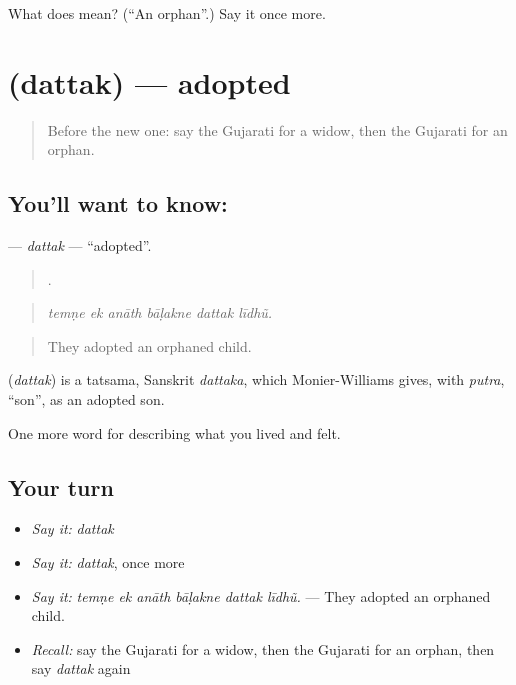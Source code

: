 \begin{tcolorbox}[breakable,colback=teal!4,colframe=teal!35!black,title={Before you move on}]
What does  mean? (\textquotedblleft{}An orphan\textquotedblright{}.) Say it once more.
\end{tcolorbox}
\section[\texorpdfstring{\gu{દત્તક} (dattak)}{દત્તક (dattak)}]{ (dattak) — adopted}

\label{lesson:GU-C500-dattak}



\begin{quote}
Before the new one: say the Gujarati for a widow, then the Gujarati for an orphan.
\end{quote}

\subsection*{You'll want to know: }
\textbf{} — \emph{dattak} — \textquotedblleft{}adopted\textquotedblright{}.

\begin{quote}
     .
\end{quote}

\begin{quote}
\emph{temṇe ek anāth bāḷakne dattak līdhũ.}
\end{quote}

\begin{quote}
They adopted an orphaned child.
\end{quote}

\begin{cousinweb}
\textbf{} (\emph{dattak}) is a tatsama, Sanskrit \emph{dattaka}, which Monier-Williams gives, with \emph{putra}, \textquotedblleft{}son\textquotedblright{}, as an adopted son.
\end{cousinweb}

\begin{grammarlens}[title={What you've built}]
One more word for describing what you lived and felt.
\end{grammarlens}

\subsection*{Your turn}
\begin{itemize}
\raggedright
  \item \emph{Say it:} \emph{dattak}
  \item \emph{Say it:} \emph{dattak}, once more
  \item \emph{Say it:} \emph{temṇe ek anāth bāḷakne dattak līdhũ.} — They adopted an orphaned child.
  \item \emph{Recall:} say the Gujarati for a widow, then the Gujarati for an orphan, then say \emph{dattak} again
\end{itemize}


